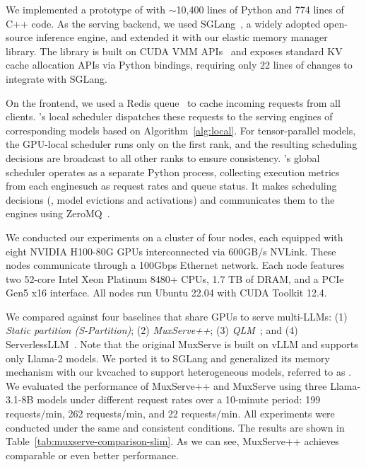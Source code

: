 \label{sec:eval}

We implemented a prototype of \tool with $\sim$10,400 lines of Python and 774 lines of C++ code. As the serving backend, we used SGLang~\cite{sglang@arxiv23}, a widely adopted open-source inference engine, and extended it with our elastic memory manager library.
The library is built on CUDA VMM APIs~\cite{cuda-vmm} and exposes standard KV cache allocation APIs via Python bindings, requiring only 22 lines of changes to integrate with SGLang.

On the frontend, we used a Redis queue~\cite{redis-list} to cache incoming requests from all clients. \tool's local scheduler dispatches these requests to the serving engines of corresponding models based on Algorithm~\ref{alg:local}.
For tensor-parallel models, the GPU-local scheduler runs only on the first rank, and the resulting scheduling decisions are broadcast to all other ranks to ensure consistency.
\tool's global scheduler operates as a separate Python process, collecting execution metrics from each engine\textemdash such as request rates and queue status. It makes scheduling decisions (\eg, model evictions and activations) and communicates them to the engines using ZeroMQ~\cite{zmq}.


We conducted our experiments on a cluster of four nodes, each equipped with eight NVIDIA H100-80G GPUs interconnected via 600GB/s NVLink. These nodes communicate through a 100Gbps Ethernet network. Each node features two 52-core Intel Xeon Platinum 8480+ CPUs, 1.7 TB of DRAM, and a PCIe Gen5 x16 interface. All nodes run Ubuntu 22.04 with CUDA Toolkit 12.4.

We compared \tool against four baselines that share GPUs to serve multi-LLMs: (1) \textit{Static partition (S-Partition)}; (2) \textit{MuxServe++}; (3) \textit{QLM~\cite{qlm}}; and (4) ServerlessLLM~\cite{fu2024serverlessllm}.
Note that the original MuxServe is built on vLLM and supports only Llama-2 models. We ported it to SGLang and generalized its memory mechanism with our kvcached to support heterogeneous models, referred to as \muxp.
We evaluated the performance of MuxServe++ and MuxServe using three Llama-3.1-8B models under different request rates over a 10-minute period: 199 requests/min, 262 requests/min, and 22 requests/min. All experiments were conducted under the same and consistent conditions. The results are shown in Table~\ref{tab:muxserve-comparison-slim}.
As we can see, MuxServe++ achieves comparable or even better performance.

